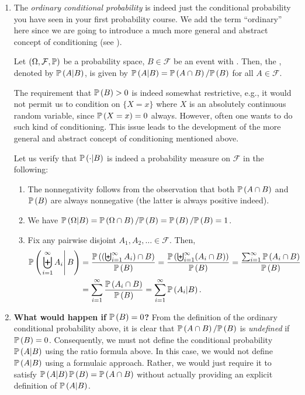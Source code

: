 \begin{enumerate}
\item The \emph{ordinary conditional probability} is indeed just the
conditional probability you have seen in your first probability course. We add
the term ``ordinary'' here since we are going to introduce a much more general
and abstract  concept of conditioning (see
).

Let \((\Omega,\mathcal{F},\mathbb{P})\) be a probability space, \(B\in\mathcal{F}\) be
an event with . Then, the , denoted by \(\mathbb{P}\left(A|B\right)\), is given by
\(\mathbb{P}\left(A|B\right)=\mathbb{P}\left(A\cap B\right)/\mathbb{P}\left(B\right)\) for all \(A\in\mathcal{F}\).
\begin{note}
The requirement that \(\mathbb{P}\left(B\right)>0\) is indeed somewhat restrictive, e.g., it
would not permit us to condition on \(\{X=x\}\) where \(X\) is an absolutely
continuous random variable, since \(\mathbb{P}\left(X=x\right)=0\) always. However, often one
wants to do such kind of conditioning. This issue leads to the development of
the more general and abstract concept of conditioning mentioned above.
\end{note}

Let us verify that \(\mathbb{P}\left(\cdot|B\right)\) is indeed a probability measure on
\(\mathcal{F}\) in the following:

\begin{pf}
\begin{enumerate}[label={(\arabic*)}]
\item The nonnegativity follows from the observation that both \(\mathbb{P}\left(A\cap
B\right)\) and \(\mathbb{P}\left(B\right)\) are always nonnegative (the latter is always positive
indeed).
\item We have \(\mathbb{P}\left(\Omega|B\right)=\mathbb{P}\left(\Omega\cap B\right)/\mathbb{P}\left(B\right)=\mathbb{P}\left(B\right)/\mathbb{P}\left(B\right)=1\).
\item Fix any pairwise disjoint \(A_1,A_2,\dotsc\in\mathcal{F}\). Then,
\begin{align*}
\mathbb{P}\left(\left.\biguplus_{i=1}^{\infty}A_i\right|B\right)
&=\frac{\mathbb{P}\left(\left(\biguplus_{i=1}^{\infty}A_i\right)\cap B\right)}{\mathbb{P}\left(B\right)}
=\frac{\mathbb{P}\left(\biguplus_{i=1}^{\infty}(A_i\cap B)\right)}{\mathbb{P}\left(B\right)}
=\frac{\sum_{i=1}^{\infty}\mathbb{P}\left(A_i\cap B\right)}{\mathbb{P}\left(B\right)} \\
&=\sum_{i=1}^{\infty}\frac{\mathbb{P}\left(A_i\cap B\right)}{\mathbb{P}\left(B\right)}
=\sum_{i=1}^{\infty}\mathbb{P}\left(A_i|B\right).
\end{align*}
\end{enumerate}
\end{pf}
\item \textbf{What would happen if \(\mathbb{P}\left(B\right)=0\)?} From the definition of
the ordinary conditional probability above, it is clear that \(\mathbb{P}\left(A\cap
B\right)/\mathbb{P}\left(B\right)\) is \emph{undefined} if \(\mathbb{P}\left(B\right)=0\). Consequently, we must not
define the conditional probability \(\mathbb{P}\left(A|B\right)\) using the ratio formula above.
In this case, we would not define \(\mathbb{P}\left(A|B\right)\) using a formulaic approach.
Rather, we would just require it to satisfy \(\mathbb{P}\left(A|B\right)\mathbb{P}\left(B\right)=\mathbb{P}\left(A\cap
B\right)\) without actually providing an explicit definition of \(\mathbb{P}\left(A|B\right)\).


\end{enumerate}

